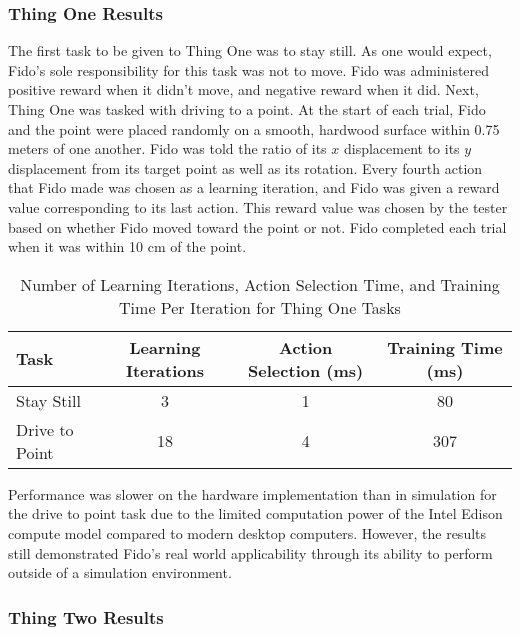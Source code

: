 \subsubsection{Thing One Results}

The first task to be given to Thing One was to stay still.
As one would expect, Fido's sole responsibility for this task was not to move.
Fido was administered positive reward when it didn't move, and negative reward when it did.
Next, Thing One was tasked with driving to a point.
At the start of each trial, Fido and the point were placed randomly on a smooth, hardwood surface within 0.75 meters of one another.
Fido was told the ratio of its $x$ displacement to its $y$ displacement from its target point as well as its rotation.
Every fourth action that Fido made was chosen as a learning iteration, and Fido was given a reward value corresponding to its last action.
This reward value was chosen by the tester based on whether Fido moved toward the point or not.
Fido completed each trial when it was within 10 cm of the point.

\begin{table}[ht]
	\centering
	\begin{tabular}{@{}lccc@{}}
		\toprule
		Task             & Learning Iterations & Action Selection (ms) & Training Time (ms) \\ \midrule
		Stay Still       & 3                   & 1                    & 80                  \\
		Drive to Point   & 18                  & 4                     & 307                  \\
	\end{tabular}
	\caption{Number of Learning Iterations, Action Selection Time, and Training Time Per Iteration for Thing One Tasks}
	\label{tab:data2}
\end{table}

Performance was slower on the hardware implementation than in simulation for the drive to point task due to the limited computation power of the Intel Edison compute model compared to modern desktop computers.
However, the results still demonstrated Fido's real world applicability through its ability to perform outside of a simulation environment.

\subsubsection{Thing Two Results}

